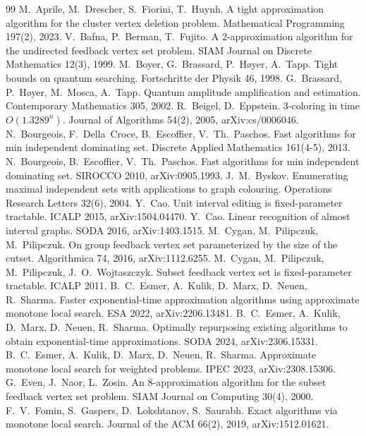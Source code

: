 \documentclass[11pt]{article}
\theoremstyle{remark}
\begin{document}
\begin{thebibliography}{99}
 M.~Aprile, M.~Drescher, S.~Fiorini, T.~Huynh. A tight approximation algorithm for the cluster vertex deletion problem. Mathematical Programming 197(2), 2023.
 V.~Bafna, P.~Berman, T.~Fujito. A 2-approximation algorithm for the undirected feedback vertex set problem. SIAM Journal on Discrete Mathematics 12(3), 1999.
 M.~Boyer, G.~Brassard, P.~H{\o}yer, A.~Tapp. Tight bounds on quantum searching. Fortschritte der Physik 46, 1998.
 G.~Brassard, P.~H{\o}yer, M.~Mosca, A.~Tapp. Quantum amplitude amplification and estimation. Contemporary Mathematics 305, 2002.
 R.~Beigel, D.~Eppstein. 3-coloring in time $O(1.3289^n)$. Journal of Algorithms 54(2), 2005, arXiv:cs/0006046.
 N.~Bourgeois, F.~Della~Croce, B.~Escoffier, V.~Th.~Paschos. Fast algorithms for min independent dominating set. Discrete Applied Mathematics 161(4-5), 2013.
 N.~Bourgeois, B.~Escoffier, V.~Th.~Paschos. Fast algorithms for min independent dominating set. SIROCCO 2010, arXiv:0905.1993.
 J.~M.~Byskov. Enumerating maximal independent sets with applications to graph colouring. Operations Research Letters 32(6), 2004.
 Y.~Cao. Unit interval editing is fixed-parameter tractable. ICALP 2015, arXiv:1504.04470.
 Y.~Cao. Linear recognition of almost interval graphs. SODA 2016, arXiv:1403.1515.
 M.~Cygan, M.~Pilipczuk, M.~Pilipczuk. On group feedback vertex set parameterized by the size of the cutset. Algorithmica 74, 2016, arXiv:1112.6255.
 M.~Cygan, M.~Pilipczuk, M.~Pilipczuk, J.~O.~Wojtaszczyk. Subset feedback vertex set is fixed-parameter tractable. ICALP 2011.
 B.~C.~Esmer, A.~Kulik, D.~Marx, D.~Neuen, R.~Sharma. Faster exponential-time approximation algorithms using approximate monotone local search. ESA 2022, arXiv:2206.13481.
 B.~C.~Esmer, A.~Kulik, D.~Marx, D.~Neuen, R.~Sharma. Optimally repurposing existing algorithms to obtain exponential-time approximations. SODA 2024, arXiv:2306.15331.
 B.~C.~Esmer, A.~Kulik, D.~Marx, D.~Neuen, R.~Sharma. Approximate monotone local search for weighted problems. IPEC 2023, arXiv:2308.15306.
 G.~Even, J.~Naor, L.~Zosin. An 8-approximation algorithm for the subset feedback vertex set problem. SIAM Journal on Computing 30(4), 2000.
 F.~V.~Fomin, S.~Gaspers, D.~Lokshtanov, S.~Saurabh. Exact algorithms via monotone local search. Journal of the ACM 66(2), 2019, arXiv:1512.01621.

\end{thebibliography}
\end{document}
